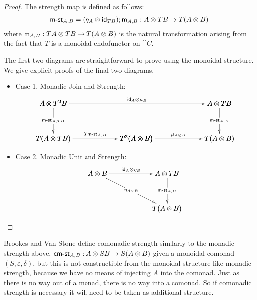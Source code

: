 \begin{proof}
  The strength map is defined as follows:
  \[
  \begin{array}{lll}
    \mst{A,B} = (\eta_{A} \otimes \id_{TB});\m{A,B} : A \otimes TB \mto T(A \otimes B)\\    
  \end{array}
  \]
  where $\m{A,B} : TA \otimes TB \mto T(A \otimes B)$ is the natural
  transformation arising from the fact that $T$ is a monoidal
  endofunctor on $\cat{C}$.

  The first two diagrams are straightforward to prove using the
  monoidal structure.  We give explicit proofs of the final two
  diagrams.

  \begin{itemize}
  \item[] Case 1. Monadic Join and Strength:
    \[
    \bfig
        \square|mmaa|/`->``->/<1200,500>[
          A \otimes T^2 B``
          T(A \otimes TB)`
          T^2(A \otimes B);`
          \mst{A,TB}``
          T\mst{A,B}]
        
    \square(1200,0)|mmma|/``->`->/<1200,500>[`
      A \otimes TB`
      T^2(A \otimes B)`
      T(A \otimes B);``
      \mst{A,B}`
      \mu_{A \otimes B}]

    \morphism(0,500)<2400,0>[
      A \otimes T^2 B`
      A \otimes TB;
      \id_{A} \otimes \mu_B]
    \efig
    \]          

  \item[] Case 2. Monadic Unit and Strength:
    \[
    \bfig
    \qtriangle|amm|<1000,500>[
      A \otimes B`
      A \otimes TB`
      T(A \otimes B);
      \id_A \otimes \eta_B`
      \eta_{A \times B}`
      \mst{A,B}]    
    \efig
    \]
    
  \end{itemize}

\end{proof}
Brookes and Van Stone \cite{?} define comonadic strength similarly to
the monadic strength above, $\cmst{A,B} : A \otimes SB \mto S(A
\otimes B)$ given a monoidal comonad $(S,\varepsilon,\delta)$, but
this is not constructible from the monoidal structure like monadic
strength, because we have no means of injecting $A$ into the comonad.
Just as there is no way out of a monad, there is no way into a
comonad. So if comonadic strength is necessary it will need to be
taken as additional structure.

